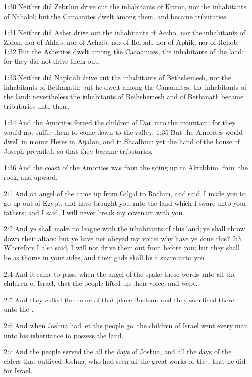 1:30 Neither did Zebulun drive out the inhabitants of Kitron, nor the inhabitants of Nahalol; but the Canaanites dwelt among them, and became tributaries.

1:31 Neither did Asher drive out the inhabitants of Accho, nor the inhabitants of Zidon, nor of Ahlab, nor of Achzib, nor of Helbah, nor of Aphik, nor of Rehob: 1:32 But the Asherites dwelt among the Canaanites, the inhabitants of the land: for they did not drive them out.

1:33 Neither did Naphtali drive out the inhabitants of Bethshemesh, nor the inhabitants of Bethanath; but he dwelt among the Canaanites, the inhabitants of the land: nevertheless the inhabitants of Bethshemesh and of Bethanath became tributaries unto them.

1:34 And the Amorites forced the children of Dan into the mountain: for they would not suffer them to come down to the valley: 1:35 But the Amorites would dwell in mount Heres in Aijalon, and in Shaalbim: yet the hand of the house of Joseph prevailed, so that they became tributaries.

1:36 And the coast of the Amorites was from the going up to Akrabbim, from the rock, and upward.

2:1 And an angel of the \LORD came up from Gilgal to Bochim, and said, I made you to go up out of Egypt, and have brought you unto the land which I sware unto your fathers; and I said, I will never break my covenant with you.

2:2 And ye shall make no league with the inhabitants of this land; ye shall throw down their altars: but ye have not obeyed my voice: why have ye done this?  2:3 Wherefore I also said, I will not drive them out from before you; but they shall be as thorns in your sides, and their gods shall be a snare unto you.

2:4 And it came to pass, when the angel of the \LORD spake these words unto all the children of Israel, that the people lifted up their voice, and wept.

2:5 And they called the name of that place Bochim: and they sacrificed there unto the \LORD.

2:6 And when Joshua had let the people go, the children of Israel went every man unto his inheritance to possess the land.

2:7 And the people served the \LORD all the days of Joshua, and all the days of the elders that outlived Joshua, who had seen all the great works of the \LORD, that he did for Israel.

